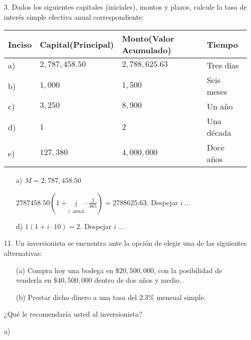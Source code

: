\begin{enumerate}
\item[3.] Dados los siguientes capitales (iniciales), montos y plazos, calcule la tasa de interés simple efectiva anual correspondiente:

\begin{tabularx}{0.9\textwidth} {
  |  >{\raggedleft\arraybackslash}X 
  | >{\centering\arraybackslash}X 
  | >{\centering\arraybackslash}X 
  | >{\centering\arraybackslash}X | }
 \hline
 Inciso & Capital(Principal) & Monto(Valor Acumulado) & Tiempo \\
 \hline
a) & $2,787,458.50$  & $2,788,625.63$  & Tres días \\
\hline
b) & $1,000$ & $1,500$ & Seis meses \\
\hline
c) & $3,250$ & $8,900$ & Un año \\
\hline
d) & $1$ & $2$ & Una década \\
\hline
e) & $127,380$ & $4,000,000$ & Doce años\\
\hline
\end{tabularx}
\begin{enumerate}
\item[a)] $M = 2,787,458.50$

$2787458.50\left( 1+\underbrace{i}_{i\,\text{ anual}} \cdot \frac{3}{365}\right) = 2788625.63$. Despejar $i \: \ldots$
\item[d)] $1(1+i\cdot 10) = 2$. Despejar $i\: \ldots$
\end{enumerate}

\item[11.] Un inversionista se encuentra ante la opción de elegir una de las siguientes alternativas:
\begin{enumerate}
\item[(a)] Compra hoy una bodega en $\$20,500,000$, con la posibilidad de venderla en $\$40,500,000$ dentro de dos años y medio.
\item[(b)] Prestar dicho dinero a una tasa del $2.3\%$ mensual simple.
\end{enumerate} 
¿Qué le recomendaría usted al inversionista?

a)
 \begin{center}
\end{center}
\end{enumerate}
